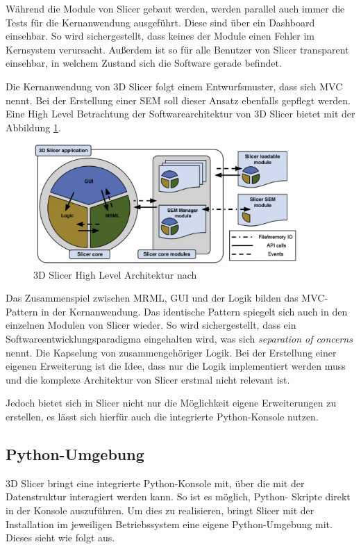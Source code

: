 Während die Module von Slicer gebaut werden, werden parallel auch immer die Tests
für die Kernanwendung ausgeführt. Diese sind über ein Dashboard einsehbar. So wird
sichergestellt, dass keines der Module einen Fehler im Kernsystem verursacht. Außerdem
ist so für alle Benutzer von Slicer transparent einsehbar, in welchem Zustand
sich die Software gerade befindet.

Die Kernanwendung von 3D Slicer folgt einem Entwurfsmuster, dass sich \ac{MVC}
nennt. Bei der Erstellung einer \ac{SEM} soll dieser Ansatz ebenfalls gepflegt
werden. Eine High Level Betrachtung der Softwarearchitektur von 3D Slicer bietet
\cite[S.~1332]{fedorov2012slicer} mit der Abbildung \ref{fig:3d_slicer_architektur}.

\begin{figure}[h]
	\centering
	\includegraphics[width=0.9\textwidth]{img/3d_slicer_architektur.jpg}
	\caption{3D Slicer High Level Architektur nach \citet[S.~1332]{fedorov2012slicer}}
	\label{fig:3d_slicer_architektur}
\end{figure}

Das Zusammenspiel zwischen \ac{MRML}, \ac{GUI} und der Logik bilden das MVC-Pattern
in der Kernanwendung. Das identische Pattern spiegelt sich auch in den einzelnen
Modulen von Slicer wieder. So wird sichergestellt, dass ein
Softwareentwicklungsparadigma eingehalten wird, was sich \textit{separation of
concerns} nennt. Die Kapselung von zusammengehöriger Logik. Bei der Erstellung
einer eigenen Erweiterung ist die Idee, dass nur die Logik implementiert werden muss
und die komplexe Architektur von Slicer erstmal nicht relevant ist.

Jedoch bietet sich in Slicer nicht nur die Möglichkeit eigene Erweiterungen zu erstellen,
es lässt sich hierfür auch die integrierte Python-Konsole nutzen.

\subsection{Python-Umgebung}
\label{subsec:pythob_umgebung} 3D Slicer bringt eine integrierte Python-Konsole
mit, über die mit der Datenstruktur interagiert werden kann. So ist es möglich, Python-
Skripte direkt in der Konsole auszuführen. Um dies zu realisieren, bringt Slicer
mit der Installation im jeweiligen Betriebssystem eine eigene Python-Umgebung
mit. Dieses sieht wie folgt aus.

